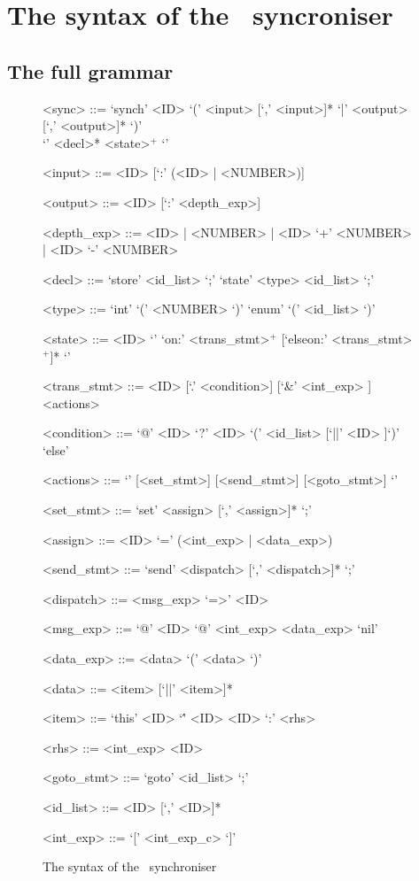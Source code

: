 \chapter{The syntax of the \ak\ syncroniser}

  \section{The full grammar\label{sync_syntax}}
\setlength{\grammarindent}{8em} %
\begin{figure}[h!]
\scriptsize
\begin{grammar}
<sync> ::= `synch' <ID> `(' <input> [`,' <input>]* `|' <output> [`,' <output>]* `)' \\
           `{' <decl>* <state>$^+$ `}'

<input>  ::= <ID> [`:' (<ID> | <NUMBER>)]

<output>  ::= <ID> [`:' <depth\_exp>]

<depth\_exp> ::= <ID> | <NUMBER> | <ID> `+' <NUMBER> | <ID> `-' <NUMBER>

<decl> ::= `store' <id\_list> `;'
        \alt `state' <type> <id\_list> `;'

<type> ::= `int' `(' <NUMBER> `)'
                  \alt `enum' `(' <id_list> `)'

<state> ::= <ID> `{' `on:' <trans\_stmt>$^+$ [`elseon:' <trans\_stmt>$^+$]* `}'

<trans\_stmt> ::= <ID> [`.' <condition>] [`&' <int\_exp> ] <actions>

<condition> ::= `@' <ID>
             \alt `?' <ID>
             \alt [`?' <ID>] `(' <id_list> [`||' <ID> ]`)'
             \alt `else'

<actions> ::= `{' [<set\_stmt>] [<send\_stmt>] [<goto\_stmt>] `}'

<set\_stmt> ::= `set' <assign> [`,' <assign>]* `;'

<assign> ::= <ID> `=' (<int\_exp> | <data\_exp>)

<send\_stmt> ::= `send' <dispatch> [`,' <dispatch>]*  `;'

<dispatch> ::= <msg\_exp> `=>' <ID>

<msg\_exp> ::= `@' <ID>
           \alt `@' <int\_exp>
           \alt [`?' <ID>] <data\_exp>
           \alt `nil'

<data\_exp> ::= <data>
             \alt `(' <data> `)'

<data> ::= <item> [`||' <item>]*

<item> ::= `this'
        \alt <ID>
        \alt `\'' <ID>
        \alt <ID> `:' <rhs>

<rhs> ::= <int\_exp>
          \alt <ID>

<goto\_stmt> ::= `goto' <id\_list> `;'

<id\_list> ::= <ID> [`,' <ID>]*

<int\_exp> ::= `[' <int_exp_c> `]'
\end{grammar}
\caption{The syntax of the \ak\ synchroniser}
\end{figure}



